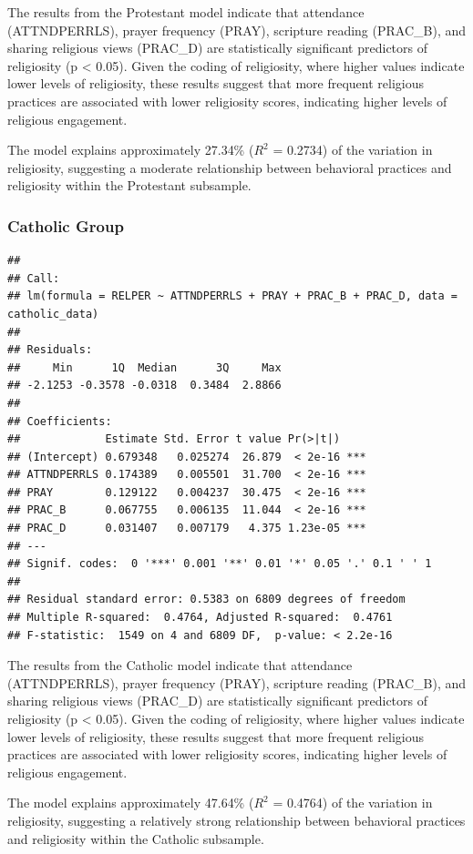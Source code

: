 \documentclass[
]{article}
\begin{document}
The results from the Protestant model indicate that attendance
(ATTNDPERRLS), prayer frequency (PRAY), scripture reading (PRAC\_B), and
sharing religious views (PRAC\_D) are statistically significant
predictors of religiosity (p \textless{} 0.05). Given the coding of
religiosity, where higher values indicate lower levels of religiosity,
these results suggest that more frequent religious practices are
associated with lower religiosity scores, indicating higher levels of
religious engagement.

The model explains approximately 27.34\% (\(R^2\) = 0.2734) of the
variation in religiosity, suggesting a moderate relationship between
behavioral practices and religiosity within the Protestant subsample.

\subsubsection{Catholic Group}\label{catholic-group}

\begin{verbatim}
## 
## Call:
## lm(formula = RELPER ~ ATTNDPERRLS + PRAY + PRAC_B + PRAC_D, data = catholic_data)
## 
## Residuals:
##     Min      1Q  Median      3Q     Max 
## -2.1253 -0.3578 -0.0318  0.3484  2.8866 
## 
## Coefficients:
##             Estimate Std. Error t value Pr(>|t|)    
## (Intercept) 0.679348   0.025274  26.879  < 2e-16 ***
## ATTNDPERRLS 0.174389   0.005501  31.700  < 2e-16 ***
## PRAY        0.129122   0.004237  30.475  < 2e-16 ***
## PRAC_B      0.067755   0.006135  11.044  < 2e-16 ***
## PRAC_D      0.031407   0.007179   4.375 1.23e-05 ***
## ---
## Signif. codes:  0 '***' 0.001 '**' 0.01 '*' 0.05 '.' 0.1 ' ' 1
## 
## Residual standard error: 0.5383 on 6809 degrees of freedom
## Multiple R-squared:  0.4764, Adjusted R-squared:  0.4761 
## F-statistic:  1549 on 4 and 6809 DF,  p-value: < 2.2e-16
\end{verbatim}

The results from the Catholic model indicate that attendance
(ATTNDPERRLS), prayer frequency (PRAY), scripture reading (PRAC\_B), and
sharing religious views (PRAC\_D) are statistically significant
predictors of religiosity (p \textless{} 0.05). Given the coding of
religiosity, where higher values indicate lower levels of religiosity,
these results suggest that more frequent religious practices are
associated with lower religiosity scores, indicating higher levels of
religious engagement.

The model explains approximately 47.64\% (\(R^2\) = 0.4764) of the
variation in religiosity, suggesting a relatively strong relationship
between behavioral practices and religiosity within the Catholic
subsample.
\end{document}
